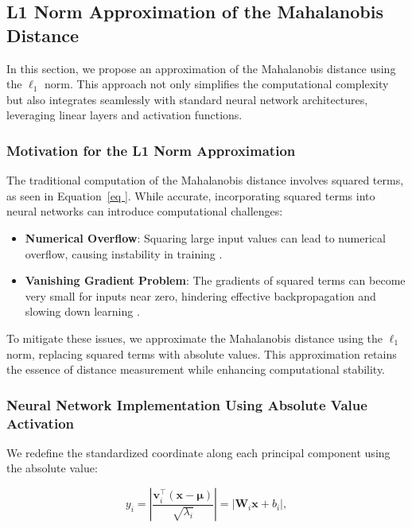 \subsection{L1 Norm Approximation of the Mahalanobis Distance}

In this section, we propose an approximation of the Mahalanobis distance using the $\ell_1$ norm. This approach not only simplifies the computational complexity but also integrates seamlessly with standard neural network architectures, leveraging linear layers and activation functions.

\subsubsection{Motivation for the L1 Norm Approximation}

The traditional computation of the Mahalanobis distance involves squared terms, as seen in Equation~\eqref{eq
}. While accurate, incorporating squared terms into neural networks can introduce computational challenges:

\begin{itemize} \item \textbf{Numerical Overflow}: Squaring large input values can lead to numerical overflow, causing instability in training \cite{goldberg1991neural}. \item \textbf{Vanishing Gradient Problem}: The gradients of squared terms can become very small for inputs near zero, hindering effective backpropagation and slowing down learning \cite{hochreiter1998vanishing}. \end{itemize}

To mitigate these issues, we approximate the Mahalanobis distance using the $\ell_1$ norm, replacing squared terms with absolute values. This approximation retains the essence of distance measurement while enhancing computational stability.

\subsubsection{Neural Network Implementation Using Absolute Value Activation}

We redefine the standardized coordinate along each principal component using the absolute value:

\begin{equation} \label{eq
} y_i = \left| \frac{ \mathbf{v}_i^\top (\mathbf{x} - \boldsymbol{\mu}) }{ \sqrt{\lambda_i} } \right| = | \mathbf{W}_i \mathbf{x} + b_i |, \end{equation}

